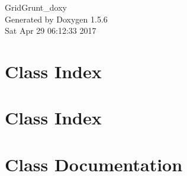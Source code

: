 \documentclass[a4paper]{book}
\begin{document}
\begin{titlepage}
\vspace*{7cm}
\begin{center}
{\Large GridGrunt\_\-doxy }\\
\vspace*{1cm}
{\large Generated by Doxygen 1.5.6}\\
\vspace*{0.5cm}
{\small Sat Apr 29 06:12:33 2017}\\
\end{center}
\end{titlepage}
\clearemptydoublepage
{}
\tableofcontents
\clearemptydoublepage
{}
\chapter{Class Index}

\chapter{Class Index}

\chapter{Class Documentation}











\printindex
\end{document}
